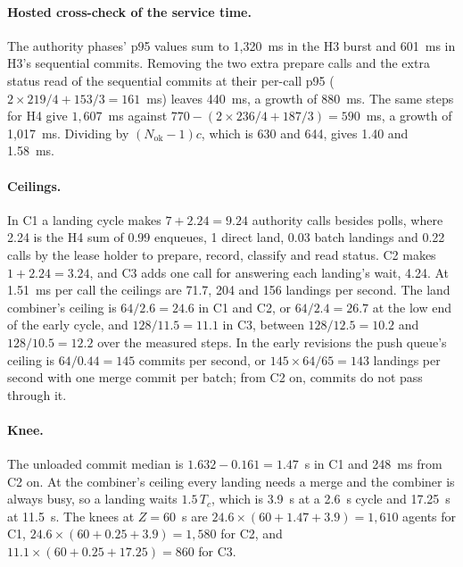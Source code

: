 \documentclass[11pt,letterpaper]{article}
\theoremstyle{definition}
\theoremstyle{remark}
\begin{document}
\paragraph{Hosted cross-check of the service time.} The authority phases' p95 values sum to 1,320~ms in the H3 burst and 601~ms in H3's sequential commits. Removing the two extra prepare calls and the extra status read of the sequential commits at their per-call p95 ($2 \times 219/4 + 153/3 = 161$~ms) leaves 440~ms, a growth of 880~ms. The same steps for H4 give $1{,}607$~ms against $770 - (2 \times 236/4 + 187/3) = 590$~ms, a growth of 1,017~ms. Dividing by $(N_{\mathrm{ok}} - 1)c$, which is 630 and 644, gives 1.40 and 1.58~ms. %

\paragraph{Ceilings.} In C1 a landing cycle makes $7 + 2.24 = 9.24$ authority calls besides polls, where 2.24 is the H4 sum of 0.99 enqueues, 1 direct land, 0.03 batch landings and 0.22 calls by the lease holder to prepare, record, classify and read status. %
C2 makes $1 + 2.24 = 3.24$, and C3 adds one call for answering each landing's wait, 4.24. %
At 1.51~ms per call the ceilings are 71.7, 204 and 156 landings per second. The land combiner's ceiling is $64/2.6 = 24.6$ in C1 and C2, or $64/2.4 = 26.7$ at the low end of the early cycle, and $128/11.5 = 11.1$ in C3, between $128/12.5 = 10.2$ and $128/10.5 = 12.2$ over the measured steps. %
In the early revisions the push queue's ceiling is $64/0.44 = 145$ commits per second, or $145 \times 64/65 = 143$ landings per second with one merge commit per batch; from C2 on, commits do not pass through it.

\paragraph{Knee.} The unloaded commit median is $1.632 - 0.161 = 1.47$~s in C1 and 248~ms from C2 on. %
At the combiner's ceiling every landing needs a merge and the combiner is always busy, so a landing waits $1.5\,T_c$, which is 3.9~s at a 2.6~s cycle and 17.25~s at 11.5~s. The knees at $Z = 60$~s are $24.6 \times (60 + 1.47 + 3.9) = 1{,}610$ agents for C1, $24.6 \times (60 + 0.25 + 3.9) = 1{,}580$ for C2, and $11.1 \times (60 + 0.25 + 17.25) = 860$ for C3.
\end{document}
